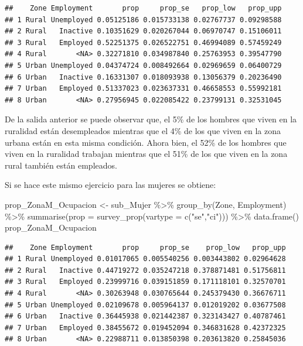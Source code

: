 \documentclass[
  12pt,
]{book}
\newenvironment{Shaded}{\begin{snugshade}}{\end{snugshade}}
\newcommand{\AttributeTok}[1]{\textcolor[rgb]{0.77,0.63,0.00}{#1}}
\newcommand{\FunctionTok}[1]{\textcolor[rgb]{0.00,0.00,0.00}{#1}}
\newcommand{\NormalTok}[1]{#1}
\newcommand{\OtherTok}[1]{\textcolor[rgb]{0.56,0.35,0.01}{#1}}
\newcommand{\SpecialCharTok}[1]{\textcolor[rgb]{0.00,0.00,0.00}{#1}}
\newcommand{\StringTok}[1]{\textcolor[rgb]{0.31,0.60,0.02}{#1}}
\begin{document}
\begin{verbatim}
##    Zone Employment       prop     prop_se   prop_low   prop_upp
## 1 Rural Unemployed 0.05125186 0.015733138 0.02767737 0.09298588
## 2 Rural   Inactive 0.10351629 0.020267044 0.06970747 0.15106011
## 3 Rural   Employed 0.52251375 0.026522751 0.46994089 0.57459249
## 4 Rural       <NA> 0.32271810 0.034987840 0.25763953 0.39547790
## 5 Urban Unemployed 0.04374724 0.008492664 0.02969659 0.06400729
## 6 Urban   Inactive 0.16331307 0.018093938 0.13056379 0.20236490
## 7 Urban   Employed 0.51337023 0.023637331 0.46658553 0.55992181
## 8 Urban       <NA> 0.27956945 0.022085422 0.23799131 0.32531045
\end{verbatim}

De la salida anterior se puede observar que, el 5\% de los hombres que viven en la ruralidad están desempleados mientras que el 4\% de los que viven en la zona urbana están en esta misma condición. Ahora bien, el 52\% de los hombres que viven en la ruralidad trabajan mientras que el 51\% de los que viven en la zona rural también están empleados.

Si se hace este mismo ejercicio para las mujeres se obtiene:

\begin{Shaded}
\begin{Highlighting}[]
\NormalTok{prop\_ZonaM\_Ocupacion }\OtherTok{\textless{}{-}}\NormalTok{ sub\_Mujer }\SpecialCharTok{\%\textgreater{}\%} 
                        \FunctionTok{group\_by}\NormalTok{(Zone, Employment) }\SpecialCharTok{\%\textgreater{}\%} 
                        \FunctionTok{summarise}\NormalTok{(}\AttributeTok{prop =} \FunctionTok{survey\_prop}\NormalTok{(}\AttributeTok{vartype =} \FunctionTok{c}\NormalTok{(}\StringTok{"se"}\NormalTok{,}\StringTok{"ci"}\NormalTok{))) }\SpecialCharTok{\%\textgreater{}\%}
                        \FunctionTok{data.frame}\NormalTok{()}
\NormalTok{prop\_ZonaM\_Ocupacion}
\end{Highlighting}
\end{Shaded}

\begin{verbatim}
##    Zone Employment       prop     prop_se    prop_low   prop_upp
## 1 Rural Unemployed 0.01017065 0.005540256 0.003443802 0.02964628
## 2 Rural   Inactive 0.44719272 0.035247218 0.378871481 0.51756811
## 3 Rural   Employed 0.23999716 0.039151859 0.171118101 0.32570701
## 4 Rural       <NA> 0.30263948 0.030765644 0.245379430 0.36676711
## 5 Urban Unemployed 0.02109678 0.005964137 0.012019202 0.03677508
## 6 Urban   Inactive 0.36445938 0.021442387 0.323143427 0.40787461
## 7 Urban   Employed 0.38455672 0.019452094 0.346831628 0.42372325
## 8 Urban       <NA> 0.22988711 0.013850398 0.203613820 0.25845036
\end{verbatim}
\end{document}
